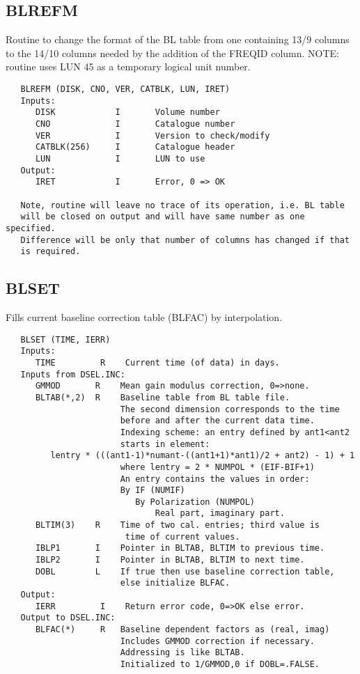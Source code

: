 \subsection{BLREFM}
Routine to change the format of the BL table from one containing
13/9 columns to the 14/10 columns needed by the addition of the
FREQID column.
NOTE: routine uses LUN 45 as a temporary logical unit number.
\begin{verbatim}
   BLREFM (DISK, CNO, VER, CATBLK, LUN, IRET)
   Inputs:
      DISK            I       Volume number
      CNO             I       Catalogue number
      VER             I       Version to check/modify
      CATBLK(256)     I       Catalogue header
      LUN             I       LUN to use
   Output:
      IRET            I       Error, 0 => OK

   Note, routine will leave no trace of its operation, i.e. BL table
   will be closed on output and will have same number as one specified.
   Difference will be only that number of columns has changed if that
   is required.
\end{verbatim}

\subsection{BLSET}
Fills current baseline correction table (BLFAC) by interpolation.
\begin{verbatim}
   BLSET (TIME, IERR)
   Inputs:
      TIME         R    Current time (of data) in days.
   Inputs from DSEL.INC:
      GMMOD       R    Mean gain modulus correction, 0=>none.
      BLTAB(*,2)  R    Baseline table from BL table file.
                       The second dimension corresponds to the time
                       before and after the current data time.
                       Indexing scheme: an entry defined by ant1<ant2
                       starts in element:
         lentry * (((ant1-1)*numant-((ant1+1)*ant1)/2 + ant2) - 1) + 1
                       where lentry = 2 * NUMPOL * (EIF-BIF+1)
                       An entry contains the values in order:
                       By IF (NUMIF)
                          By Polarization (NUMPOL)
                              Real part, imaginary part.
      BLTIM(3)    R    Time of two cal. entries; third value is
                        time of current values.
      IBLP1       I    Pointer in BLTAB, BLTIM to previous time.
      IBLP2       I    Pointer in BLTAB, BLTIM to next time.
      DOBL        L    If true then use baseline correction table,
                       else initialize BLFAC.
   Output:
      IERR         I    Return error code, 0=>OK else error.
   Output to DSEL.INC:
      BLFAC(*)     R   Baseline dependent factors as (real, imag)
                       Includes GMMOD correction if necessary.
                       Addressing is like BLTAB.
                       Initialized to 1/GMMOD,0 if DOBL=.FALSE.
\end{verbatim}

